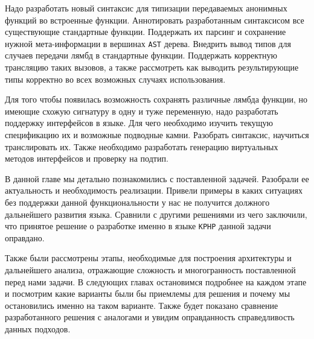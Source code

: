 Надо разработать новый синтаксис для типизации передаваемых анонимных функций во встроенные функции.
Аннотировать разработанным синтаксисом все существующие стандартные функции.
Поддержать их парсинг и сохранение нужной мета-информации в вершинах \verb|AST| дерева.
Внедрить вывод типов для случаев передачи лямбд в стандартные функции.
Поддержать корректную трансляцию таких вызовов, а также рассмотреть как выводить результирующие типы корректно во всех возможных случаях использования.

Для того чтобы появилась возможность сохранять различные лямбда функции, но имеющие схожую сигнатуру в одну и туже переменную, надо разработать поддержку интерфейсов в языке.
Для чего необходимо изучить текущую спецификацию их и возможные подводные камни.
Разобрать синтаксис, научиться транслировать их.
Также необходимо разработать генерацию виртуальных методов интерфейсов и проверку на подтип.

\chapterconclusion
В данной главе мы детально познакомились с поставленной задачей.
Разобрали ее актуальность и необходимость реализации.
Привели примеры в каких ситуациях без поддержки данной функциональности у нас не получится должного дальнейшего развития языка.
Сравнили с другими решениями из чего заключили, что принятое решение о разработке именно в языке \verb|KPHP| данной задачи оправдано.

Также были рассмотрены этапы, необходимые для построения архитектуры и дальнейшего анализа, отражающие сложность и многогранность поставленной перед нами задачи.
В следующих главах остановимся подробнее на каждом этапе и посмотрим какие варианты были бы приемлемы для решения и почему мы остановились именно на таком варианте.
Также будет показано сравнение разработанного решения с аналогами и увидим оправданность справедливость данных подходов.



